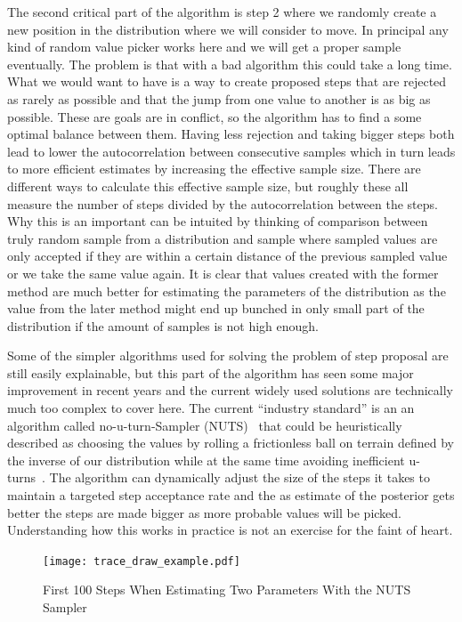 \documentclass[12pt,a4paper,leqno]{report}
\theoremstyle{plain}
\theoremstyle{definition}
\theoremstyle{remark}
\begin{document}
The second critical part of the algorithm is step 2 where we randomly create a new
position in the distribution where we will consider to move. In principal any kind of
random value picker works here and we will get a proper sample eventually. The problem is
that with a bad algorithm this could take a long time. What we would want to have is a
way to create proposed steps that are rejected as rarely as possible and that the
jump from one value to another is as big as possible. These are goals are in
conflict, so the algorithm has to find a some optimal balance between them.
Having less rejection and taking bigger steps both lead to lower the autocorrelation
between consecutive samples which in turn leads to more efficient estimates by increasing the
effective sample size. There are different ways to calculate this effective sample size, but roughly
these all measure the number of steps divided by the autocorrelation between the steps.
Why this is an important can be intuited by thinking of comparison between truly random sample from a distribution and
sample where sampled values are only accepted if they are within a certain distance of the
previous sampled value or we take the same value again. It is clear that values created
with the former method are much better for
estimating the parameters of the distribution as the value from the later method might
end up bunched in only small part of the distribution if the amount of samples is not
high enough.

Some of the simpler algorithms used for solving the problem of step proposal are still easily explainable, but
this part of the algorithm has seen some major improvement in recent years and the
current widely used solutions are technically much too complex to cover here. The
current ``industry standard'' is an an algorithm called no-u-turn-Sampler (NUTS)\ \cite{nuts}
that could be heuristically described as choosing the values by rolling a frictionless
ball on terrain defined by the inverse of our distribution while at the same time
avoiding inefficient u-turns\ \cite{kruschke}. The algorithm can dynamically adjust the
size of the steps it takes to maintain a targeted step acceptance rate and the as estimate of
the posterior gets better the steps are made bigger as more probable values will be
picked. Understanding how this works in practice is not an exercise for the faint of heart.

\begin{figure}[H]
    \centering
    \caption{First 100 Steps When Estimating Two Parameters With the NUTS Sampler}\label{traceexample}
    \texttt{[image: trace\_draw\_example.pdf]}
\end{figure}
\end{document}
